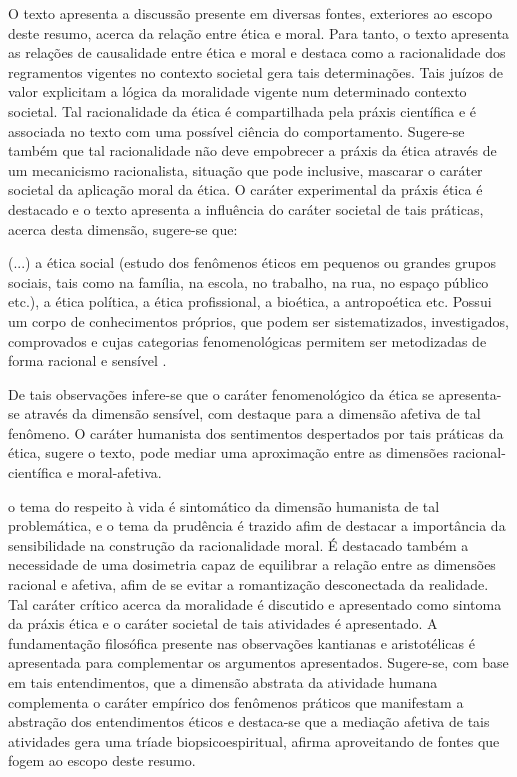 \documentclass[
   article,       %
   12pt,          %
   oneside,       %
   a4paper,       %
   english,       %
   brazil,           %
   sumario=tradicional
   ]{abntex2}
\begin{document}
O texto apresenta a discussão presente em diversas fontes, exteriores ao escopo deste resumo, acerca da relação entre ética e moral. Para tanto, o texto apresenta as relações de causalidade entre ética e moral e destaca como a racionalidade dos regramentos vigentes no contexto societal gera tais determinações. Tais juízos de valor explicitam a lógica da moralidade vigente num determinado contexto societal. Tal racionalidade da ética é compartilhada pela práxis científica e é associada no texto com uma possível ciência do comportamento. Sugere-se também que tal racionalidade não deve empobrecer a práxis da ética através de um mecanicismo racionalista, situação que pode inclusive, mascarar o caráter societal da aplicação moral da ética. O caráter experimental da práxis ética é destacado e o texto apresenta a influência do caráter societal de tais práticas, acerca desta dimensão, sugere-se que: 

\begin{citacao}
(...) a ética social (estudo dos fenômenos éticos em pequenos ou grandes grupos sociais, tais como na família, na escola, no trabalho, na rua, no espaço público etc.), a ética política, a ética profissional, a bioética, a antropoética etc. Possui um corpo de conhecimentos próprios, que podem ser sistematizados, investigados, comprovados e cujas categorias fenomenológicas permitem ser metodizadas de forma racional e sensível . 
\end{citacao}

De tais observações infere-se que o caráter fenomenológico da ética se apresenta-se através da dimensão sensível, com destaque para a dimensão afetiva de tal fenômeno. O caráter humanista dos sentimentos despertados por tais práticas da ética, sugere o texto, pode mediar uma aproximação entre as dimensões racional-científica e moral-afetiva. 

o tema do respeito à vida é sintomático da dimensão humanista de tal problemática, e o tema da prudência é trazido afim de destacar a importância da sensibilidade na construção da racionalidade moral. É destacado também a necessidade de uma dosimetria capaz de equilibrar a relação entre as dimensões racional e afetiva, afim de se evitar a romantização desconectada da realidade. Tal caráter crítico acerca da moralidade é discutido e apresentado como sintoma da práxis ética e o caráter societal de tais atividades é apresentado. A fundamentação filosófica presente nas observações kantianas e aristotélicas é apresentada para complementar os argumentos apresentados. Sugere-se, com base em tais entendimentos, que a dimensão abstrata da atividade humana complementa o caráter empírico dos fenômenos práticos que manifestam a abstração dos entendimentos éticos e destaca-se que a mediação afetiva de tais atividades gera uma tríade biopsicoespiritual, afirma  aproveitando de fontes que fogem ao escopo deste resumo.
\end{document}
